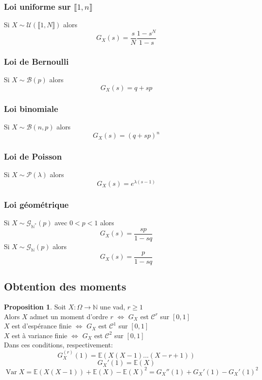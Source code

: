 \documentclass[10pt,a4paper]{article}
\theoremstyle{definition}
\newtheorem{proposition}{Proposition}[section]
\DeclareMathOperator{\var}{Var}
\begin{document}
\subsubsection{Loi uniforme sur \(\llbracket 1, n \rrbracket\)}
\noindent Si \(X \sim \mathcal{U}(\llbracket 1, N \rrbracket)\) alors
\[\boxed{G_X(s) = \frac{s}{N} \frac{1 - s^N}{1 - s}}\]

\subsubsection{Loi de Bernoulli}
\noindent Si \(X \sim \mathcal{B}(p)\) alors
\[\boxed{G_X(s) = q + sp}\]

\subsubsection{Loi binomiale}
\noindent Si \(X \sim \mathcal{B}(n, p)\) alors
\[\boxed{G_X(s) = (q + sp)^n}\]

\subsubsection{Loi de Poisson}
\noindent Si \(X \sim \mathcal{P}(\lambda)\) alors
\[\boxed{G_X(s) = e^{\lambda(s - 1)}}\]

\subsubsection{Loi géométrique}
\noindent Si \(X \sim \mathcal{G}_{\mathbb{N}^*}(p)\) avec \(0 < p < 1\) alors
\[\boxed{G_X(s) = \frac{sp}{1 - sq}}\]
Si \(X \sim \mathcal{G}_{\mathbb{N}}(p)\) alors
\[\boxed{G_X(s) = \frac{p}{1 - sq}}\]

\subsection{Obtention des moments}
\begin{proposition}
    Soit \(X: \Omega \to \mathbb{N}\) une vad, \(r \geq 1\) \\
    Alors \(X\) admet un moment d'ordre \(r\) \(\iff\) \(G_X\) est \(\mathcal{C}^r\) sur \([0, 1]\) \\
    \(X\) est d'espérance finie \(\iff\) \(G_X\) est \(\mathcal{C}^1\) sur \([0, 1]\) \\
    \(X\) est à variance finie \(\iff\) \(G_X\) est \(\mathcal{C}^2\) sur \([0, 1]\) \\
    Dans ces conditions, respectivement:
    \[G_X^{(r)}(1) = \mathbb{E}(X(X - 1)...(X - r + 1))\]
    \[\boxed{G_X'(1) = \mathbb{E}(X)}\]
    \[\boxed{\var X = \mathbb{E}(X(X - 1)) + \mathbb{E}(X) - \mathbb{E}(X)^2 = G_X''(1) + G_X'(1) - G_X'(1)^2}\]
\end{proposition}
\end{document}
